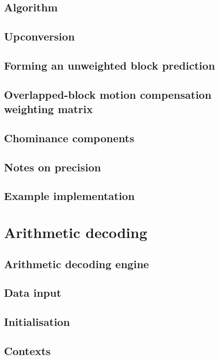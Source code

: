 \subsection{Algorithm}
\subsection{Upconversion}
\subsection{Forming an unweighted block prediction}
\subsection{Overlapped-block motion compensation weighting matrix}
\subsection{Chominance components}
\subsection{Notes on precision}
\subsection{Example implementation}

\clearpage
\section{Arithmetic decoding}
\subsection{Arithmetic decoding engine}
\subsection{Data input}
\subsection{Initialisation}
\subsection{Contexts}
